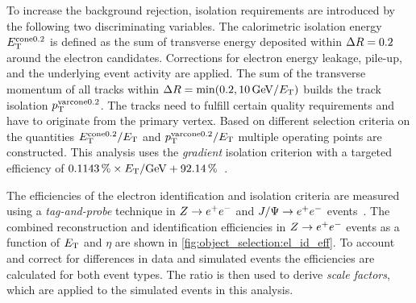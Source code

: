 To increase the background rejection, isolation requirements are introduced by the following two discriminating variables.
The calorimetric isolation energy $E_\text{T}^{\text{cone}0.2}$ is defined as the sum of transverse energy deposited within
$\Delta R = 0.2$ around the electron candidates.
Corrections for electron energy leakage, pile-up, and the underlying event activity are applied.
The sum of the transverse momentum of all tracks within $\dr = \min(0.2, \SI{10}{\GeV} / \et)$ builds the
track isolation $p_\text{T}^{\text{varcone}0.2}$. The tracks need to fulfill certain quality requirements and have to originate
from the primary vertex.
Based on different selection criteria on the quantities $E_\text{T}^{\text{cone}0.2} / E_\text{T}$ and
$p_\text{T}^{\text{varcone}0.2} / E_\text{T}$ multiple operating points are constructed. This analysis uses the \emph{gradient}
isolation criterion with a targeted efficiency of
$\SI{0.1143}{\percent} \times \et / \si{\GeV} + \SI{92.14}{\percent}$~\cite{ATLAS-CONF-2016-024}.

The efficiencies of the electron identification and isolation criteria are measured using a \emph{tag-and-probe} technique
in $Z \to e^+e^-$ and $J/\Psi \to e^+e^-$ events~\cite{ATLAS-CONF-2016-024}.
The combined reconstruction and identification efficiencies in $Z \to e^+e^-$ events as a function of $E_\text{T}$ and $\eta$
are shown in \cref{fig:object_selection:el_id_eff}.
To account and correct for differences in data and simulated events the efficiencies are calculated for both event types.
The ratio is then used to derive \emph{scale factors}, which are applied to the simulated events in this analysis.

